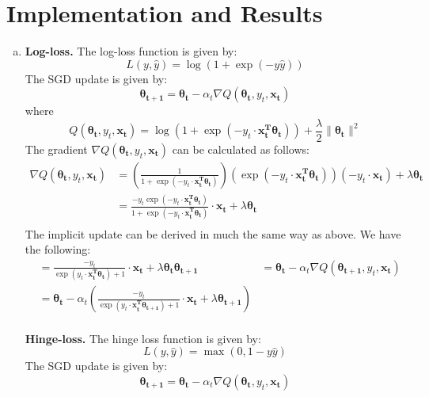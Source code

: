 \documentclass{article}
\renewcommand{\vec}[1]{\boldsymbol{#1}}
\begin{document}
\section{Implementation and Results}

\begin{enumerate}[(a)]
\item \textbf{Log-loss.} The log-loss function is given by:
\begin{equation}
L(y, \hat{y}) = \log(1+\exp(-y\hat{y}))
\end{equation}
The SGD update is given by:
\begin{equation}
\vec{\theta_{t+1}} = \vec{\theta_{t}} - \alpha_{t}\nabla Q(\vec{\theta_{t}}, y_t, \vec{x_t})
\end{equation}
where
\begin{equation}
Q(\vec{\theta_{t}}, y_t, \vec{x_t}) = \log\left(1+\exp(-y_t\cdot\vec{x_t^{T}}\vec{\theta_t})\right) + \frac{\lambda}{2}\|\vec{\theta_t}\|^2
\end{equation}
The gradient $\nabla Q(\vec{\theta_{t}}, y_t, \vec{x_t})$ can be calculated as follows:
\begin{align*}
\nabla Q(\vec{\theta_{t}}, y_t, \vec{x_t}) &= \left(\frac{1}{1+\exp(-y_t\cdot\vec{x_t^{T}}\vec{\theta_t})} \right)\left(\exp(-y_t\cdot\vec{x_t^{T}}\vec{\theta_t})\right)\left(-y_t\cdot\vec{x_t}\right) + \lambda\vec{\theta_t}\\
&= \frac{-y_t\exp(-y_t\cdot\vec{x_t^{T}}\vec{\theta_t})}{1+\exp(-y_t\cdot\vec{x_t^{T}}\vec{\theta_t})}\cdot\vec{x_t} + \lambda\vec{\theta_t}\\
\end{align*}
The implicit update can be derived in much the same way as above. We have the following:
\begin{align*}
&= \frac{-y_t}{\exp(y_t\cdot\vec{x_t^{T}}\vec{\theta_t})+1}\cdot\vec{x_t} + \lambda\vec{\theta_t}
\vec{\theta_{t+1}} &= \vec{\theta_t} - \alpha_t \nabla Q(\vec{\theta_{t+1}}, y_t, \vec{x_t})\\
&= \vec{\theta_t} - \alpha_t \left(\frac{-y_t}{\exp(y_t\cdot\vec{x_t^{T}}\vec{\theta_{t+1}})+1}\cdot\vec{x_t} + \lambda\vec{\theta_{t+1}} \right)
\end{align*}\\

\textbf{Hinge-loss.} The hinge loss function is given by:
\begin{equation}
L(y, \hat{y}) = \max(0, 1-y\hat{y})
\end{equation}
The SGD update is given by:
\begin{equation}
\vec{\theta_{t+1}} = \vec{\theta_{t}} - \alpha_{t}\nabla Q(\vec{\theta_{t}}, y_t, \vec{x_t})
\end{equation}


\end{enumerate}
\end{document}
